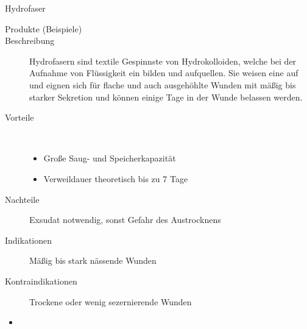 \TextSlide
{Hydrofaser}
{
\begin{description}
  \item[Produkte (Beispiele)]  
  \item[Beschreibung] {Hydrofasern} sind textile
  Gespinnste von Hydrokolloiden, welche bei der Aufnahme von
  Flüssigkeit ein  bilden
  und aufquellen.
  Sie weisen eine
   auf und eignen sich für
  flache und auch ausgehöhlte Wunden mit mäßig bis starker Sekretion und
  können einige Tage in der Wunde belassen werden.
  \item[Vorteile] ~
  \begin{itemize}
    \item[$+$] Große Saug- und
    Speicherkapazität
    \item[$+$] Verweildauer theoretisch bis zu 7 Tage
  \end{itemize}
  \item[Nachteile] Exsudat notwendig, sonst Gefahr des
    Austrocknens
  \item[Indikationen] Mäßig bis stark nässende 
    Wunden
  \item[Kontraindikationen] Trockene oder wenig
  sezernierende Wunden
\end{description}
}
{
\begin{itemize}
  \item {} 
\end{itemize}
}{}{}{}

